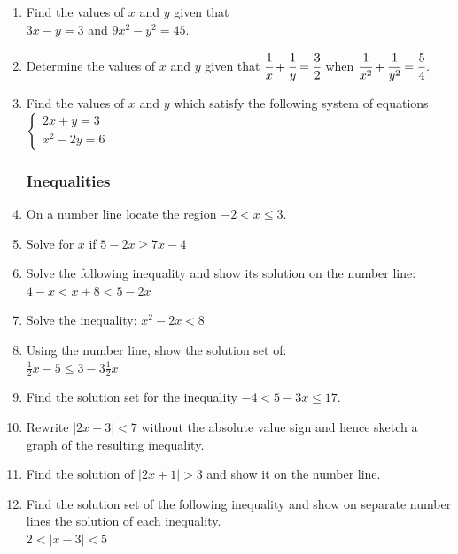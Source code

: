 \begin{enumerate}
	\item Find the values of $x$ and $y$ given that\\
	$3x - y = 3$ and $9x^2 - y^2 = 45$.
	
	\item Determine the values of $x$ and $y$ given that $\cfrac{1}{x} + \cfrac{1}{y} = \cfrac{3}{2}$ when $\cfrac{1}{x^2} + \cfrac{1}{y^2} = \cfrac{5}{4}$.
	
	\item Find the values of $x$ and $y$ which satisfy the following system of equations
		$\left\{
	\begin{array}{l}
	2x + y = 3\\
	x^2 - 2y = 6
	\end{array} \right.$
	
	
		\subsubsection{Inequalities}
		
	\item On a number line locate the region $-2 < x \leq 3$.
	
	\item Solve for $x$ if $5 - 2x \geq 7x - 4$
	
	\item Solve the following inequality and show its solution on the number line: $4 - x < x + 8 < 5 - 2x$
	
	\item Solve the inequality: $x^2 - 2x < 8$
	
	\item Using the number line, show the solution set of:\\
	$\frac{1}{2}x - 5 \leq 3 - 3\frac{1}{2}x$
	
	\item Find the solution set for the inequality $-4 < 5 - 3x \leq 17$.
	
	\item Rewrite $|2x + 3| < 7$ without the absolute value sign and hence sketch a graph of the resulting inequality.
	
	\item Find the solution of $|2x + 1| > 3$ and show it on the number line.
	
	\item Find the solution set of the following inequality and show on separate number lines the solution of each inequality.\\
	$2 < |x - 3| < 5$



\end{enumerate}
